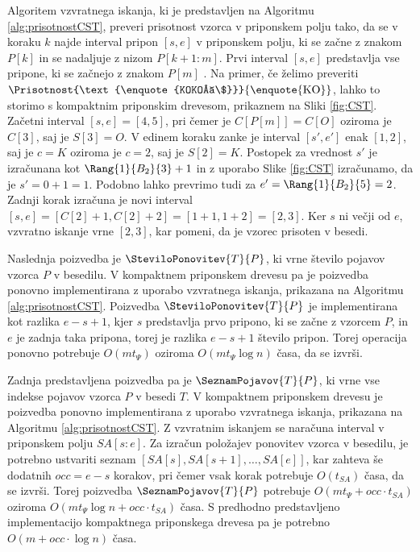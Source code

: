 Algoritem vzvratnega iskanja, ki je predstavljen na Algoritmu \ref{alg:prisotnostCST}, preveri prisotnost vzorca v priponskem polju tako, da se v koraku $k$ najde interval pripon $[s,e]$ v priponskem polju, ki se začne z znakom $P[k]$ in se nadaljuje z nizom $P[k+1:m]$. Prvi interval $[s,e]$ predstavlja vse pripone, ki se začnejo z znakom $P[m]$ \cite{Navarro2016}. Na primer, če želimo preveriti $\Prisotnost{\text{\enquote{KOKOŠ\$}}}{\text{\enquote{KO}}}$, lahko to storimo s kompaktnim priponskim drevesom, prikaznem na Sliki \ref{fig:CST}. Začetni interval $[s,e]=[4,5]$, pri čemer je $C[P[m]]=C[O]$ oziroma je $C[3]$, saj je $S[3]=O$. V edinem koraku zanke je interval $[s',e']$ enak $[1,2]$, saj je $c=K$ oziroma je $c=2$, saj je $S[2]=K$. Postopek za vrednost $s'$ je izračunana kot $\Rang{1}{B_2}{3}+1$ in z uporabo Slike \ref{fig:CST} izračunamo, da je $s'=0+1=1$. Podobno lahko prevrimo tudi za $e'=\Rang{1}{B_2}{5}=2$. Zadnji korak izračuna je novi interval $[s,e]=[C[2]+1,C[2]+2]=[1+1,1+2]=[2,3]$. Ker $s$ ni večji od $e$, vzvratno iskanje vrne $[2,3]$, kar pomeni, da je vzorec prisoten v besedi.

Naslednja poizvedba je $\SteviloPonovitev{T}{P}$, ki vrne število pojavov vzorca $P$ v besedilu. V kompaktnem priponskem drevesu pa je poizvedba ponovno implementirana z uporabo vzvratnega iskanja, prikazana na Algoritmu \ref{alg:prisotnostCST}. Poizvedba $\SteviloPonovitev{T}{P}$ je implementirana kot razlika $e-s+1$, kjer $s$ predstavlja prvo pripono, ki se začne z vzorcem $P$, in $e$ je zadnja taka pripona, torej je razlika $e-s+1$ število pripon. Torej operacija ponovno potrebuje $O(mt_\Psi)$ oziroma $O(mt_\Psi\log{n})$ časa, da se izvrši.

Zadnja predstavljena poizvedba pa je $\SeznamPojavov{T}{P}$, ki vrne vse indekse pojavov vzorca $P$ v besedi $T$. V kompaktnem priponskem drevesu je poizvedba ponovno implementirana z uporabo vzvratnega iskanja, prikazana na Algoritmu \ref{alg:prisotnostCST}. Z vzvratnim iskanjem se naračuna interval v priponskem polju $SA[s:e]$. Za izračun položajev ponovitev vzorca v besedilu, je potrebno ustvariti seznam $[SA[s],SA[s+1],\dots,SA[e]]$, kar zahteva še dodatnih $occ=e-s$ korakov, pri čemer vsak korak potrebuje $O(t_{SA})$ časa, da se izvrši. Torej poizvedba $\SeznamPojavov{T}{P}$ potrebuje $O(mt_\Psi+occ\cdot t_{SA})$ oziroma $O(mt_\Psi \log{n}+occ\cdot t_{SA})$ časa. S predhodno predstavljeno implementacijo kompaktnega priponskega drevesa pa je potrebno $O(m+occ\cdot\log{n})$ časa.

